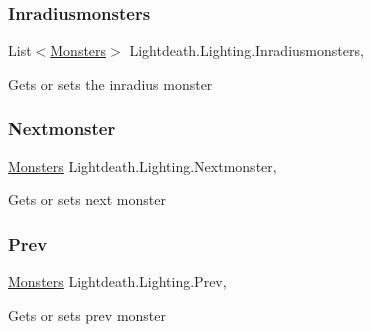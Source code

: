 \subsubsection{\texorpdfstring{Inradiusmonsters}{Inradiusmonsters}}
{\footnotesize\ttfamily List$<$\hyperlink{class_lightdeath_1_1_monsters}{Monsters}$>$ Lightdeath.\+Lighting.\+Inradiusmonsters\hspace{0.3cm}{\ttfamily [get]}, {\ttfamily [set]}}



Gets or sets the inradius monster 

\hypertarget{class_lightdeath_1_1_lighting_a8c9100512d19df6f9db0dfc49d5398c5}{}\label{class_lightdeath_1_1_lighting_a8c9100512d19df6f9db0dfc49d5398c5} 
\subsubsection{\texorpdfstring{Nextmonster}{Nextmonster}}
{\footnotesize\ttfamily \hyperlink{class_lightdeath_1_1_monsters}{Monsters} Lightdeath.\+Lighting.\+Nextmonster\hspace{0.3cm}{\ttfamily [get]}, {\ttfamily [set]}}



Gets or sets next monster 

\hypertarget{class_lightdeath_1_1_lighting_a09a9936b710638b0e4d0f39fb3c6361e}{}\label{class_lightdeath_1_1_lighting_a09a9936b710638b0e4d0f39fb3c6361e} 
\subsubsection{\texorpdfstring{Prev}{Prev}}
{\footnotesize\ttfamily \hyperlink{class_lightdeath_1_1_monsters}{Monsters} Lightdeath.\+Lighting.\+Prev\hspace{0.3cm}{\ttfamily [get]}, {\ttfamily [set]}}



Gets or sets prev monster 

\hypertarget{class_lightdeath_1_1_lighting_afee12b3ca02edeba58f4a0e6af6fe0c6}{}\label{class_lightdeath_1_1_lighting_afee12b3ca02edeba58f4a0e6af6fe0c6} 

